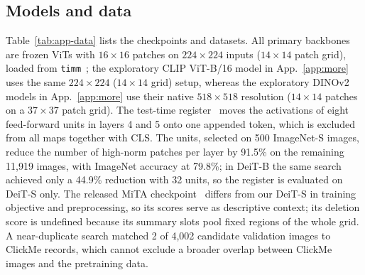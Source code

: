 \subsection{Models and data}
Table~\ref{tab:app-data} lists the checkpoints and datasets. All primary backbones are frozen ViTs with $16{\times}16$ patches on $224{\times}224$ inputs ($14{\times}14$ patch grid), loaded from \texttt{timm}~\citep{wightman2019}; the exploratory CLIP ViT-B/16 model in App.~\ref{app:more} uses the same $224{\times}224$ ($14{\times}14$ grid) setup, whereas the exploratory DINOv2 models in App.~\ref{app:more} use their native $518{\times}518$ resolution ($14{\times}14$ patches on a $37{\times}37$ patch grid). The test-time register~\citep{jiang2025} moves the activations of eight feed-forward units in layers 4 and 5 onto one appended token, which is excluded from all maps together with CLS. The units, selected on 500 ImageNet-S images, reduce the number of high-norm patches per layer by 91.5\% on the remaining 11,919 images, with ImageNet accuracy at 79.8\%; in DeiT-B the same search achieved only a 44.9\% reduction with 32 units, so the register is evaluated on DeiT-S only. The released MiTA checkpoint~\citep{wen2026mita} differs from our DeiT-S in training objective and preprocessing, so its scores serve as descriptive context; its deletion score is undefined because its summary slots pool fixed regions of the whole grid. A near-duplicate search matched 2 of 4,002 candidate validation images to ClickMe records, which cannot exclude a broader overlap between ClickMe images and the pretraining data.

